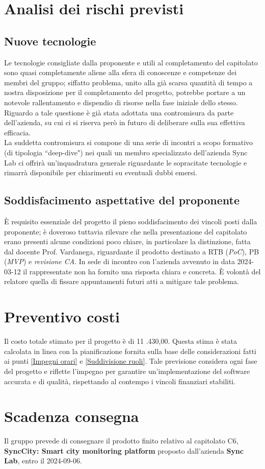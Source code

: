 \documentclass[8pt]{article}
\begin{document}
\section{Analisi dei rischi previsti}
\subsection{Nuove tecnologie}
Le tecnologie consigliate dalla proponente e utili al completamento del capitolato sono quasi completamente aliene alla sfera di conoscenze e competenze dei membri del gruppo; siffatto problema, unito alla già scarsa quantità di tempo a nostra disposizione per il completamento del progetto, potrebbe portare a un notevole rallentamento e dispendio di risorse nella fase iniziale dello stesso.
Riguardo a tale questione è già stata adottata una contromisura da parte dell'azienda, su cui ci si riserva però in futuro di deliberare sulla sua effettiva efficacia. \\
La suddetta contromisura si compone di una serie di incontri a scopo formativo (di tipologia ``deep-dive") nei quali un membro specializzato dell'azienda Sync Lab ci offrirà un'inquadratura generale riguardante le sopracitate tecnologie e rimarrà disponibile per chiarimenti su eventuali dubbi emersi.
\subsection{Soddisfacimento aspettative del proponente}
\`E requisito essenziale del progetto il pieno soddisfacimento dei vincoli posti dalla proponente; è doveroso tuttavia rilevare che nella presentazione del capitolato erano presenti alcune condizioni poco chiare, in particolare la distinzione, fatta dal docente Prof. Vardanega, riguardante il prodotto destinato a RTB (\textit{PoC}), PB (\textit{MVP}) e \textit{revisione CA}. In sede di incontro con l'azienda avvenuto in data 2024-03-12 il rappresentate non ha fornito una risposta chiara e concreta. \`E volontà del relatore quella di fissare appuntamenti futuri atti a mitigare tale problema.
\newpage
\section{Preventivo costi}
Il costo totale stimato per il progetto è di 11 .430,00\;\texteuro. Questa stima è stata calcolata in linea con la pianificazione fornita sulla base delle considerazioni fatti ai punti \ref{Impegni orari} e \ref{Suddivisione ruoli}. Tale previsione considera ogni fase del progetto e riflette l'impegno per garantire un'implementazione del software accurata e di qualità, rispettando al contempo i vincoli finanziari stabiliti. 
\section{Scadenza consegna}
Il gruppo prevede di consegnare il prodotto finito relativo al capitolato C6, \textbf{SyncCity: Smart city monitoring platform} proposto dall'azienda \textbf{Sync Lab}, entro il 2024-09-06.
\end{document}
